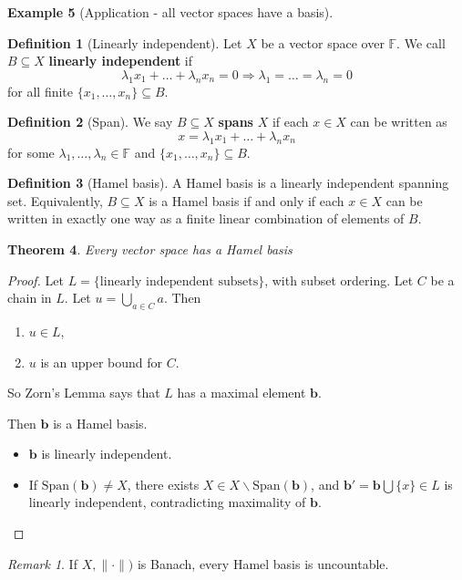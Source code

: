 \documentclass[10pt, reqno, oneside]{amsart}
\theoremstyle{plain}%
\newtheorem{thm}{Theorem}[section]
\theoremstyle{definition}
\newtheorem{defn}[thm]{Definition}
\newtheorem{exmp}[thm]{Example}
\theoremstyle{remark}
\newtheorem*{rem}{Remark}
\newcommand{\F}{\mathbb{F}}
\begin{document}
\begin{exmp}[Application - all vector spaces have a basis]
	\begin{defn}[Linearly independent]
		Let $X$ be a vector space over $\F$.  We call $B \subseteq X$ \textbf{linearly independent} if \[
			\lambda_1 x_1 + \dots + \lambda_n x_n = 0 \Rightarrow \lambda_1 = \dots = \lambda_n = 0
		\] for all finite $\{ x_1, \dots, x_n \} \subseteq B$. 
	\end{defn}
	
	\begin{defn}[Span]
		We say $B \subseteq X$ \textbf{spans} $X$ if each $x \in X$ can be written as \[
			x = \lambda_1 x_1 + \dots + \lambda_n x_n
		\] for some $\lambda_1, \dots, \lambda_n \in \F$ and $\{ x_1, \dots, x_n \} \subseteq B$. 
	\end{defn}
	
	\begin{defn}[Hamel basis]
		A Hamel basis is a linearly independent spanning set. Equivalently, $B \subseteq X$ is a Hamel basis if and only if each $x \in X$ can be written in exactly one way as a finite linear combination of elements of $B$.
	\end{defn}
	
	\begin{thm}
		Every vector space has a Hamel basis
	\end{thm}
	
	\begin{proof}
		Let $L = \{ \text{linearly independent subsets} \}$, with subset ordering.  Let $C$ be a chain in $L$.  Let $u = \bigcup_{a \in C} a$.  Then 
		\begin{enumerate}[(1)]
			\item $u \in L$,
			\item $u$ is an upper bound for $C$.
		\end{enumerate}  
		So Zorn's Lemma says that $L$ has a maximal element $\mathbf{b}$.  
		
		Then $\mathbf{b}$ is a Hamel basis. 
		\begin{itemize}
			\item $\mathbf{b}$ is linearly independent.  
			\item If $\text{Span}(\mathbf{b}) \neq X$, there exists $X \in X \backslash \text{Span}(\mathbf{b})$, and $\mathbf{b'} = \mathbf{b} \bigcup \{ x \} \in L$ is linearly independent, contradicting maximality of $\mathbf{b}$.
		\end{itemize}  
	\end{proof}
	
	\begin{rem}
		If $ X, \| \cdot \| )$ is Banach, every Hamel basis is uncountable.
	\end{rem}
\end{exmp}
\end{document}

